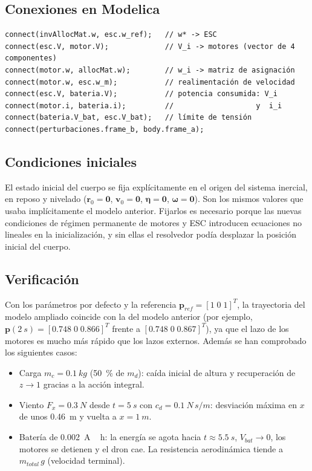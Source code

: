 \subsection{Conexiones en Modelica}
\begin{lstlisting}
connect(invAllocMat.w, esc.w_ref);   // w* -> ESC
connect(esc.V, motor.V);             // V_i -> motores (vector de 4 componentes)
connect(motor.w, allocMat.w);        // w_i -> matriz de asignación
connect(motor.w, esc.w_m);           // realimentación de velocidad
connect(esc.V, bateria.V);           // potencia consumida: V_i
connect(motor.i, bateria.i);         //                   y  i_i
connect(bateria.V_bat, esc.V_bat);   // límite de tensión
connect(perturbaciones.frame_b, body.frame_a);
\end{lstlisting}

\subsection{Condiciones iniciales}
El estado inicial del cuerpo se fija explícitamente en el origen del sistema inercial,
en reposo y nivelado ($\mathbf{r}_0 = \mathbf{0}$, $\mathbf{v}_0 = \mathbf{0}$,
$\boldsymbol\eta = \mathbf{0}$, $\boldsymbol\omega = \mathbf{0}$). Son los mismos
valores que usaba implícitamente el modelo anterior. Fijarlos es necesario porque las
nuevas condiciones de régimen permanente de motores y ESC introducen ecuaciones no
lineales en la inicialización, y sin ellas el resolvedor podía desplazar la posición
inicial del cuerpo.

\subsection{Verificación}
Con los parámetros por defecto y la referencia $\mathbf{p}_{ref} = [1\;0\;1]^T$, la
trayectoria del modelo ampliado coincide con la del modelo anterior (por ejemplo,
$\mathbf{p}(\SI{2}{s}) = [0.748\;0\;0.866]^T$ frente a $[0.748\;0\;0.867]^T$), ya que
el lazo de los motores es mucho más rápido que los lazos externos. Además se han
comprobado los siguientes casos:
\begin{itemize}
  \item Carga $m_c = \SI{0.1}{kg}$ (\SI{50}{\%} de $m_d$): caída inicial de altura y
        recuperación de $z \rightarrow 1$ gracias a la acción integral.
  \item Viento $F_x = \SI{0.3}{N}$ desde $t = \SI{5}{s}$ con $c_d = \SI{0.1}{N\,s/m}$:
        desviación máxima en $x$ de unos \SI{0.46}{m} y vuelta a $x = \SI{1}{m}$.
  \item Batería de \SI{0.002}{A\,h}: la energía se agota hacia $t \approx \SI{5.5}{s}$,
        $V_{bat} \rightarrow 0$, los motores se detienen y el dron cae. La resistencia
        aerodinámica tiende a $m_{total}\,g$ (velocidad terminal).
\end{itemize}
